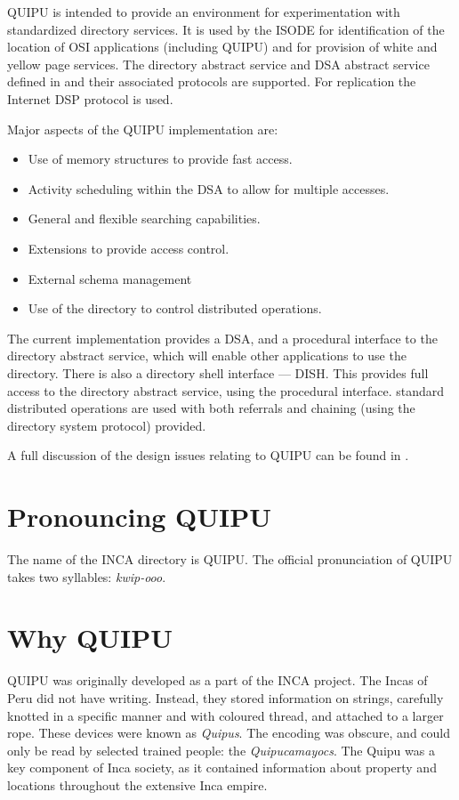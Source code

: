 QUIPU is intended to provide an environment
for experimentation with standardized directory services.
It is used by the ISODE for identification of the location of OSI
applications (including QUIPU) and for provision of white and yellow
page services.
The directory abstract service and DSA abstract service
defined in \cite{CCITT.Directory,ISO.Directory} and their associated 
protocols are supported.
For replication the Internet DSP protocol is used.

Major aspects of the QUIPU implementation are:
\begin{itemize}
\item
Use of  memory structures to provide fast access.
\item
Activity scheduling within the DSA to allow for multiple accesses.
\item
General and flexible searching capabilities.
\item
Extensions to provide access control.
\item
External schema management
\item
Use of the directory to control distributed operations.
\end{itemize}

The current implementation provides a DSA, and a procedural interface to the
directory abstract service, which will enable other applications to use the
directory.
There is also a directory shell interface --- DISH.  This provides full
access to the directory abstract service, using the procedural interface.
standard distributed operations are used with both referrals and chaining
(using the directory system protocol) provided.

A full discussion of the design issues relating to QUIPU can be
found in \cite{QUIPU.Design}.

\section {Pronouncing QUIPU}

The name of the INCA directory is QUIPU.
The official pronunciation of QUIPU takes two syllables:
{\em kwip-ooo}.

\section {Why QUIPU}

QUIPU was originally developed as a part of the INCA project.
The Incas of Peru did not have writing.  Instead, they stored information on
strings, carefully knotted in a specific manner and with coloured thread, and
attached to a larger rope.
These devices were known as {\em Quipus}.
The encoding was obscure, and could only be read by selected trained people:
the {\em Quipucamayocs}.
The Quipu was a key component of Inca society, as it contained information
about property and locations throughout the extensive Inca empire.


